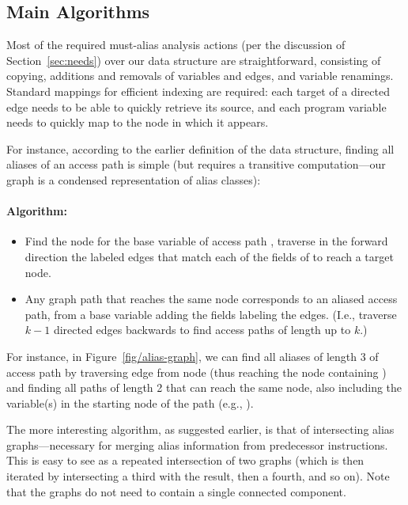 

\subsection{Main Algorithms}

Most of the required must-alias analysis actions (per the discussion of
Section~\ref{sec:needs}) over our data structure are
straightforward, consisting of copying, additions and removals of
variables and edges, and variable renamings. Standard mappings for efficient
indexing are required: each target of a directed edge needs to be able
to quickly retrieve its source, and each program variable needs to
quickly map to the node in which it appears. 

For instance, according to the earlier definition of the data
structure, finding all aliases of an access path is simple (but requires a
transitive computation---our graph is a condensed representation of alias
classes):

\paragraph{Algorithm: }
\begin{itemize}
\item Find the node for the base variable of access path , traverse
   in the forward direction the labeled edges that match each of the fields
   of  to reach a target node.
\item Any graph path that reaches the same node corresponds to an
  aliased access path, from a base variable adding the fields
  labeling the edges. (I.e., traverse $k-1$ directed edges backwards
  to find access paths of length up to $k$.)
\end{itemize}

For instance, in Figure~\ref{fig/alias-graph}, we can find all aliases
of length 3 of access path  by traversing edge
 from node  (thus reaching the node containing
) and finding all paths of length 2 that can reach the same
node, also including the variable(s) in the starting node of the path
(e.g., ).

The more interesting algorithm, as suggested earlier, is that of
intersecting alias graphs---necessary for merging alias information
from predecessor instructions. This is easy to see as a repeated
intersection of two graphs (which is then iterated by intersecting a
third with the result, then a fourth, and so on). Note that the graphs
do not need to contain a single connected component.


